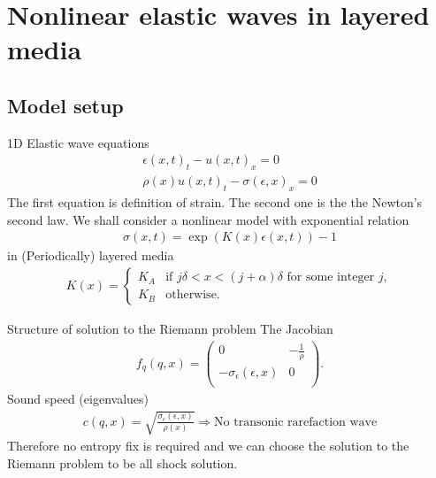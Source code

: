 \documentclass{beamer}
\begin{document}
\section{Nonlinear elastic waves in layered media}
\subsection{Model setup}
\begin{frame}{1D Elastic wave equations}
\begin{align*}
\epsilon(x,t)_t-u(x,t)_x=0 \\
\rho(x) u(x,t)_t-\sigma(\epsilon,x)_x=0
\end{align*}
The first equation is definition of strain. The second one is the the Newton's second law. We shall consider a nonlinear model with exponential relation
\begin{align*}
\sigma(x,t)=\exp(K(x)\epsilon(x,t))-1
\end{align*}
in (Periodically) layered media
\begin{align*}
K(x)=\left\{
\begin{array}{cc}
K_A & \mbox{if }j\delta<x<(j+\alpha)\delta \mbox{ for some integer } j,\\
K_B & \mbox{otherwise.}
\end{array}
\right.
\end{align*}
\end{frame}

\begin{frame}{Structure of solution to the Riemann problem}
The Jacobian
\begin{align*}
f_q(q,x)=\left(
                     \begin{array}{cc}
                       0  &  -\frac{1}{\rho}\\
                       -\sigma_{\epsilon}(\epsilon,x) &  0 \\
                     \end{array}
                   \right).
\end{align*}
Sound speed (eigenvalues)
\begin{align*}
c(q,x)=\sqrt{\frac{\sigma_{\epsilon}(\epsilon,x)}{\rho(x)}}  \Longrightarrow \mbox{No transonic rarefaction wave}
\label{sounds}
\end{align*}
Therefore no entropy fix is required and we can choose the solution to the Riemann problem to be all shock solution.
\end{frame}
\end{document}

